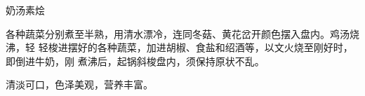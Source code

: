 \begin{recipe}{奶汤素烩}

\ingredients


\cooking

各种蔬菜分别煮至半熟，用清水漂冷，连同冬菇、黄花岔开颜色摆入盘内。鸡汤烧沸，轻
轻梭进摆好的各种蔬菜，加进胡椒、食盐和绍酒等，以文火烧至刚好时，即倒进牛奶，刚
煮沸后，起锅斜梭盘内，须保持原状不乱。

\notes

清淡可口，色泽美观，营养丰富。

\end{recipe}

